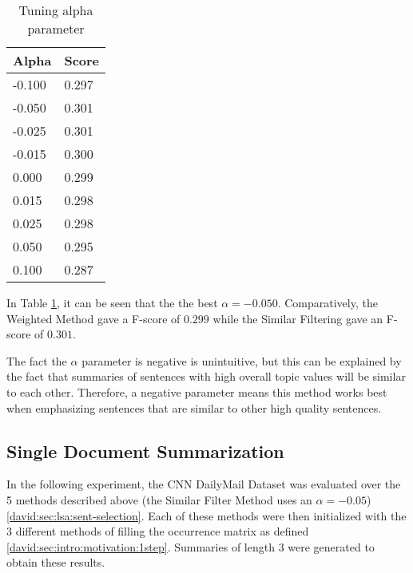 \documentclass[../writeup.tex]{subfiles}
\begin{document}
\begin{table}[]
    \centering
    \begin{tabular}{|l|l|}
        \hline
        Alpha                          & Score                         \\ \hline
        -0.100                         & 0.297                         \\ \hline
        \cellcolor[HTML]{F8FF00}-0.050 & \cellcolor[HTML]{F8FF00}0.301 \\ \hline
        -0.025                         & 0.301                         \\ \hline
        -0.015                         & 0.300                         \\ \hline
        0.000                          & 0.299                         \\ \hline
        0.015                          & 0.298                         \\ \hline
        0.025                          & 0.298                         \\ \hline
        0.050                          & 0.295                         \\ \hline
        0.100                          & 0.287                         \\ \hline
    \end{tabular}
    \caption{Tuning alpha parameter}
    \label{david:table:similar-alphas}
\end{table}

In Table \ref{david:table:similar-alphas}, it can be seen that the the best $\alpha = -0.050$.
Comparatively, the Weighted Method gave a F-score of $0.299$ while the Similar Filtering gave an F-score of $0.301$.

The fact the $\alpha$ parameter is negative is unintuitive, but this can be explained by the fact that summaries of sentences with high overall topic values will be similar to each other.
Therefore, a negative parameter means this method works best when emphasizing sentences that are similar to other high quality sentences.

\subsection{Single Document Summarization}\label{david:sec:experiments:singledocument}

In the following experiment, the CNN DailyMail Dataset was evaluated over the 5 methods described above (the Similar Filter Method uses an $\alpha = -0.05$) \ref{david:sec:lsa:sent-selection}. Each of these methods were then initialized with the 3 different methods of filling the occurrence matrix as defined \ref{david:sec:intro:motivation:1step}. Summaries of length $3$ were generated to obtain these results.
\end{document}
